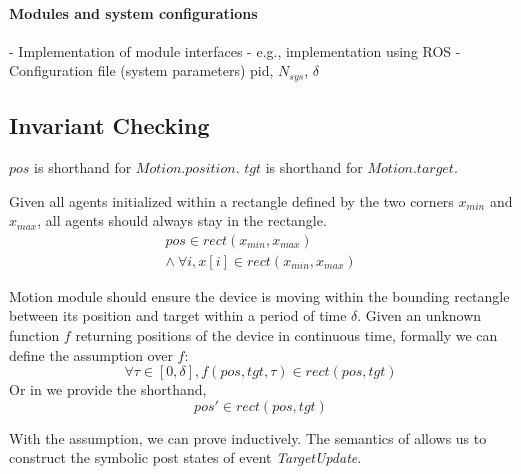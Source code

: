 

\paragraph{Modules and system configurations}
- Implementation of module interfaces
- e.g., implementation using ROS
- Configuration file (system parameters) pid, $N_{sys}$, $\delta$


\subsection{Invariant Checking}

$pos$ is shorthand for $Motion.position$. $tgt$ is shorthand for $Motion.target$.

\begin{invariant}\label{inv:lineform}
Given all agents initialized within a rectangle defined by the two corners $x_{min}$ and $x_{max}$,
all agents should always stay in the rectangle.
\[
\begin{split}
    pos \in rect(x_{min}, x_{max})        \\
    \land\ \forall i, x[i] \in rect(x_{min}, x_{max})
\end{split}
\]
\end{invariant}


\begin{assumption}\label{lineform-assume}
Motion module should ensure the device is moving within the bounding rectangle between its position and target
within a period of time $\delta$.
Given an unknown function $f$ returning positions of the device in continuous time,
formally we can define the assumption over $f$:
\[
\forall \tau \in [0, \delta], f(pos, tgt, \tau) \in rect(pos, tgt)
\]
Or in \lgname we provide the shorthand,
\[
pos' \in rect(pos, tgt)
\]
\end{assumption}

With the assumption, we can prove  inductively.
The \K semantics of \lgname allows us to construct the symbolic post states of event \emph{TargetUpdate}.


\begin{figure}
\end{figure}


